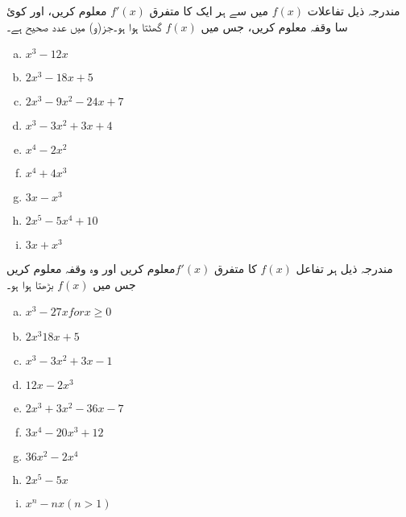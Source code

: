 مندرجہ ذیل تفاعلات  \(f(x)\) میں سے ہر ایک کا متفرق 		\( f\prime (x)\) معلوم کریں، اور کوئ سا وقفہ معلوم کریں، جس میں 	 \(f(x)\) 	گھٹتا ہوا ہو۔جز(و) میں  عدد صحیح ہے۔
\begin{multicols}{3}
\begin{enumerate}[a.]
\item \(  x^{3}-12x \hspace{50pt}  \)
\item \(   2x^{3}-18x+5 \hspace{50pt} \)
\item  \( 2x^{3}-9x^{2}-24x+7   \)
\item  \(  x^{3}-3x^{2}+3x+4 \hspace{50pt}   \)
\item  \(  x^{4}-2x^{2} \hspace{50pt}    \)
\item \(   x^{4}+4x^{3}   \)
\item \( 3x-x^{3} \hspace{50pt}   \)
\item \(  2x^{5}-5x^{4}+10 \hspace{50pt}  \)
\item  \( 3x+x^{3}    \)
\end{enumerate}
\end{multicols}
مندرجہ ذیل ہر تفاعل 	 \(f(x)\) 	کا متفرق \( f\prime (x)\)معلوم کریں اور وہ وقفہ معلوم کریں جس میں   \(f(x)\) بڑھتا ہوا ہو۔
\begin{multicols}{3}
\begin{enumerate}[a.]
\item \(  x^{3}-27x for x\geq 0 \hspace{30pt}  \)
\item \(  2x^{3}18x+5  \)
\item  \(x^{3}-3x^{2}+3x-1 \)
\item  \(  12x-2x^{3} \hspace{50pt}  \)
\item  \(  2x^{3}+3x^{2}-36x-7 \hspace{50pt}  \)
\item \(  3x^{4}-20x^{3}+12   \)
\item \(36x^{2}-2x^{4} \hspace{50pt}     \)
\item \( 2x^{5}-5x \hspace{50pt}   \)
\item \(x^{n}-nx (n>1)   \)
\end{enumerate}
\end{multicols}
